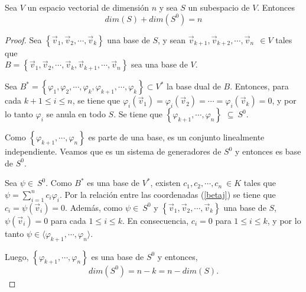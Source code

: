 \begin{theorem} 
\label{TeodimS0}
Sea $V$ un espacio vectorial de dimensión $n$ y sea $S$ un subespacio de $V$. Entonces 
$$dim(S)+dim(S^0) = n$$

\bigskip

\begin{proof}
Sea $\left\{\vec{v}_1,\vec{v}_2,\cdots, \vec{v}_k\right\}$ una base de $S$, y sean $  \vec{v}_{k+1},\vec{v}_{k+2},\cdots, \vec{v}_n\  ~ \in V$  tales que \\ $B=\left\{\vec{v}_1,\vec{v}_2,\cdots, \vec{v}_k,  \vec{v}_{k+1},\cdots, \vec{v}_n \right \}$ sea una base de $V$.

Sea $ B^* =\left\{\varphi_1,\varphi_2,\cdots, \varphi_k, \varphi_{k+1}, \cdots, \varphi_k \right\}  \subset V^*$ la base dual de $B$. Entonces, para cada $k+1 \leq i \leq n$, se tiene que $ \varphi_i(\vec{v}_1)=\varphi_i(\vec{v}_2) =\cdots = \varphi_i(\vec{v}_k)=0 $, y por lo tanto    $\varphi_i $  se anula en todo $S$. Se tiene que   $  \left\{\varphi_{k+1}, \cdots, \varphi_n \right\}$ $  \subseteq  ~S^0$.

  Como $  \left\{\varphi_{k+1}, \cdots, \varphi_n \right\}$ es parte de una base, es un conjunto linealmente independiente. Veamos que es un sistema de generadores de $S^0$ y entonces es base de $S^0$.

\bigskip

  Sea $ \psi  \in ~S^0 $. Como $ B^*$ es una base de $V^*$, existen $  c_1,c_2, \cdots, c_n ~ \in K $ tales que 
$ \psi = \sum^n_{i=1} c_i \varphi_i$. Por la relación entre las coordenadas (\ref{betaj}) se tiene que $  c_i= \psi(\vec{v}_i)=0$. Además, como $ \psi \in ~S^0$ y $\left\{\vec{v}_1,\vec{v}_2,\cdots, \vec{v}_k\right\}$ una base de $S$, $ \psi(\vec{v}_i)=0$ para cada $1 \leq i \leq k$. En consecuencia, $c_i=0$  para $1 \leq i \leq k$, y por lo tanto $ \psi \in \langle \varphi_{k+1}, \cdots, \varphi_n  \rangle $. 

\bigskip

Luego, $  \left\{\varphi_{k+1}, \cdots, \varphi_n \right\}$ es una base de $S^0$ y entonces, $$dim(S^0) = n - k = n-dim(S). $$
\end{proof}
\end{theorem}

\bigskip



\bigskip

\bigskip


